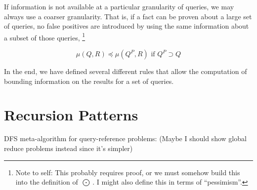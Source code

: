 \documentclass[times, leqno,twocolumn]{article}
\newcommand{\authornote}[1]{\footnote{Note to self: #1}}
\newcommand{\kdparent}[1]{#1^{\!P}}
\newcommand{\myOutop}[1]{\mathop{\bigodot\nolimits\!\!_{#1}}}
\newcommand{\inmu}{\mu}
\newcommand{\Outopmu}{\myOutop{\mu}}
\newcommand{\allowmu}{\preceq}
\begin{document}
\noindent 
If information is not available at a particular granularity of queries, we may always use a coarser granularity.
That is, if a fact can be proven about a large set of queries, no false positives are introduced by using the same information about a subset of those queries,
\authornote{This probably requires proof, or we must somehow build this into the definition of $\Outopmu$.  I might also define this in terms of ``pessimism''.}

\begin{equation}
\inmu(Q, R) \allowmu \inmu(\kdparent{Q}, R) \text{ if } \kdparent{Q} \supset Q
\end{equation}

\noindent In the end, we have defined several different rules that allow the computation of bounding information on the results for a set of queries.

\section{Recursion Patterns}

DFS meta-algorithm for query-reference problems:
(Maybe I should show global reduce problems instead since it's simpler)
\end{document}
